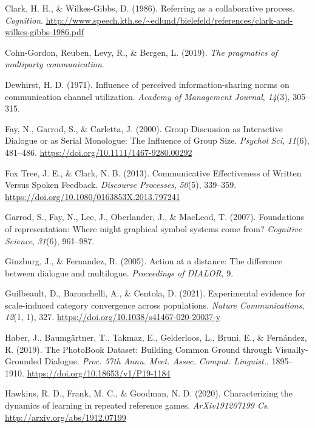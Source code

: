 \documentclass[
  english,
]{article}
\newlength{\cslhangindent}
\newenvironment{CSLReferences}[2] %
{\begin{list}{}{%
			\setlength{\itemindent}{0pt}
			\setlength{\leftmargin}{0pt}
			\setlength{\parsep}{0pt}
			\ifodd #1
			\setlength{\leftmargin}{\cslhangindent}
			\setlength{\itemindent}{-1\cslhangindent}
			\fi
			\setlength{\itemsep}{#2\baselineskip}}}
	{\end{list}}
\begin{document}
\begin{CSLReferences}{1}{0}
Clark, H. H., \& Wilkes-Gibbs, D. (1986). Referring as a collaborative process. \emph{Cognition}. \url{http://www.speech.kth.se/~edlund/bielefeld/references/clark-and-wilkes-gibbs-1986.pdf}

Cohn-Gordon, Reuben, Levy, R., \& Bergen, L. (2019). \emph{The pragmatics of multiparty communication}.

Dewhirst, H. D. (1971). Influence of perceived information-sharing norms on communication channel utilization. \emph{Academy of Management Journal}, \emph{14}(3), 305--315.

Fay, N., Garrod, S., \& Carletta, J. (2000). Group {Discussion} as {Interactive Dialogue} or as {Serial Monologue}: {The Influence} of {Group Size}. \emph{Psychol Sci}, \emph{11}(6), 481--486. \url{https://doi.org/10.1111/1467-9280.00292}

Fox Tree, J. E., \& Clark, N. B. (2013). Communicative {Effectiveness} of {Written Versus Spoken Feedback}. \emph{Discourse Processes}, \emph{50}(5), 339--359. \url{https://doi.org/10.1080/0163853X.2013.797241}

Garrod, S., Fay, N., Lee, J., Oberlander, J., \& MacLeod, T. (2007). Foundations of representation: Where might graphical symbol systems come from? \emph{Cognitive Science}, \emph{31}(6), 961--987.

Ginzburg, J., \& Fernandez, R. (2005). Action at a distance: The difference between dialogue and multilogue. \emph{Proceedings of DIALOR}, 9.

Guilbeault, D., Baronchelli, A., \& Centola, D. (2021). Experimental evidence for scale-induced category convergence across populations. \emph{Nature Communications}, \emph{12}(1, 1), 327. \url{https://doi.org/10.1038/s41467-020-20037-y}

Haber, J., Baumgärtner, T., Takmaz, E., Gelderloos, L., Bruni, E., \& Fernández, R. (2019). The {PhotoBook Dataset}: {Building Common Ground} through {Visually-Grounded Dialogue}. \emph{Proc. 57th {Annu}. {Meet}. {Assoc}. {Comput}. {Linguist}.}, 1895--1910. \url{https://doi.org/10.18653/v1/P19-1184}

Hawkins, R. D., Frank, M. C., \& Goodman, N. D. (2020). Characterizing the dynamics of learning in repeated reference games. \emph{ArXiv191207199 Cs}. \url{http://arxiv.org/abs/1912.07199}


\end{CSLReferences}
\end{document}
